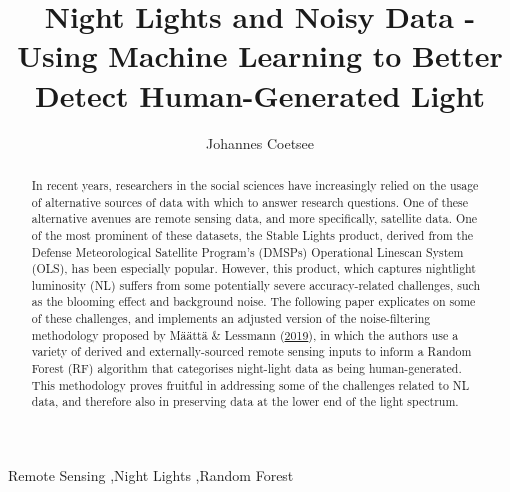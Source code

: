 \documentclass[11pt,preprint, authoryear]{elsarticle}
\numberwithin{equation}{section}
\numberwithin{figure}{section}
\numberwithin{table}{section}
\begin{document}
\begin{frontmatter}  %

\title{Night Lights and Noisy Data - Using Machine Learning to Better
Detect Human-Generated Light}





\author[Add1]{Johannes Coetsee}





\address[Add1]{Stellenbosch University}


\begin{abstract}
\small{
In recent years, researchers in the social sciences have increasingly
relied on the usage of alternative sources of data with which to answer
research questions. One of these alternative avenues are remote sensing
data, and more specifically, satellite data. One of the most prominent
of these datasets, the Stable Lights product, derived from the Defense
Meteorological Satellite Program's (DMSPs) Operational Linescan System
(OLS), has been especially popular. However, this product, which
captures nightlight luminosity (NL) suffers from some potentially severe
accuracy-related challenges, such as the blooming effect and background
noise. The following paper explicates on some of these challenges, and
implements an adjusted version of the noise-filtering methodology
proposed by Määttä \& Lessmann (\protect\hyperlink{ref-maatta}{2019}),
in which the authors use a variety of derived and externally-sourced
remote sensing inputs to inform a Random Forest (RF) algorithm that
categorises night-light data as being human-generated. This methodology
proves fruitful in addressing some of the challenges related to NL data,
and therefore also in preserving data at the lower end of the light
spectrum.
}
\end{abstract}

\vspace{1cm}

\begin{keyword}
\footnotesize{
Remote Sensing \sep Night Lights \sep Random Forest \\ \vspace{0.3cm}
}
\end{keyword}
\vspace{0.5cm}
\end{frontmatter}



\pagestyle{fancy}
\chead{}
\lfoot{}
\lhead{}
\cfoot{}
\end{document}
